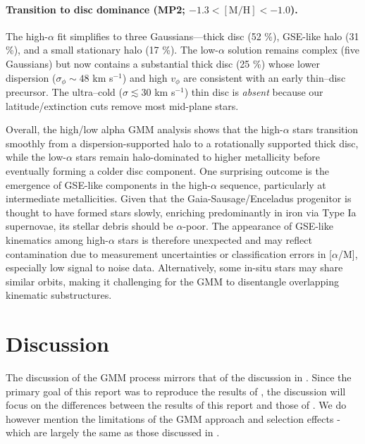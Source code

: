 \documentclass[a4paper,12pt]{article}
\begin{document}
\paragraph{Transition to disc dominance (MP2; $-1.3<[\mathrm{M/H}]<-1.0$).}
The high-$\alpha$ fit simplifies to three Gaussians—thick disc (52 \%),
GSE-like halo (31 \%), and a small stationary halo (17 \%).
The low-$\alpha$ solution remains complex (five Gaussians) but now
contains a substantial thick disc (25 \%) whose lower dispersion
($\sigma_{\phi}\!\sim\!48$ km s$^{-1}$) and high $v_{\phi}$ are
consistent with an early thin–disc precursor.
The ultra–cold ($\sigma\!\lesssim\!30$ km s$^{-1}$) thin disc is
\emph{absent} because our latitude/extinction cuts remove most
mid-plane stars.

\vspace{1em}
Overall, the high/low alpha GMM analysis shows that the high-$\alpha$ stars 
transition smoothly from a dispersion-supported halo to a rotationally supported thick disc, 
while the low-$\alpha$ stars remain halo-dominated to higher metallicity before eventually 
forming a colder disc component.  
One surprising outcome is the emergence of GSE-like components in the high-$\alpha$ sequence, 
particularly at intermediate metallicities.  
Given that the Gaia-Sausage/Enceladus progenitor is thought to have formed stars slowly, 
enriching predominantly in iron via Type Ia supernovae, its stellar debris should be 
$\alpha$-poor.  
The appearance of GSE-like kinematics among high-$\alpha$ stars is therefore unexpected and 
may reflect contamination due to measurement uncertainties or classification errors in 
[$\alpha$/M], especially low signal to noise data.  
Alternatively, some in-situ stars may share similar orbits, making it challenging for the 
GMM to disentangle overlapping kinematic substructures.  






\section{Discussion} \label{sec:discussion}

The discussion of the GMM process mirrors that of the discussion in \citet{zhang2024existencemetalpoordiscmilky}.
Since the primary goal of this report was to reproduce the results of \citet{zhang2024existencemetalpoordiscmilky},
the discussion will focus on the differences between the results of this report and those of \citet{zhang2024existencemetalpoordiscmilky}.
We do however mention the limitations of the GMM approach and selection effects - which are largely 
the same as those discussed in \citet{zhang2024existencemetalpoordiscmilky}.
\end{document}
